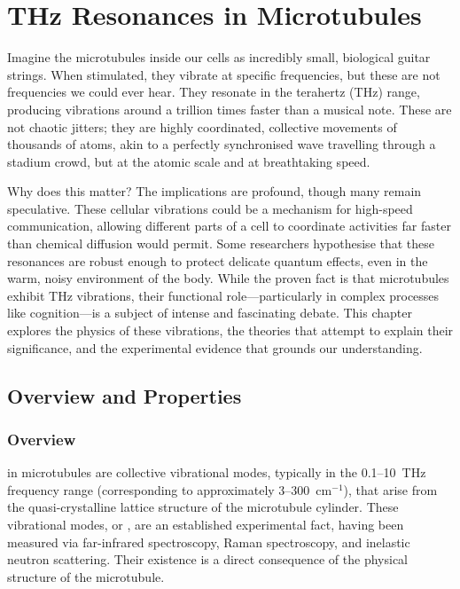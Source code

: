 
\chapter{THz Resonances in Microtubules}
\label{ch:thz-resonances-microtubules}

\begin{nontechnical}
    Imagine the microtubules inside our cells as incredibly small, biological guitar strings. When stimulated, they vibrate at specific frequencies, but these are not frequencies we could ever hear. They resonate in the terahertz (THz) range, producing vibrations around a trillion times faster than a musical note. These are not chaotic jitters; they are highly coordinated, collective movements of thousands of atoms, akin to a perfectly synchronised wave travelling through a stadium crowd, but at the atomic scale and at breathtaking speed.

    Why does this matter? The implications are profound, though many remain speculative. These cellular vibrations could be a mechanism for high-speed communication, allowing different parts of a cell to coordinate activities far faster than chemical diffusion would permit. Some researchers hypothesise that these resonances are robust enough to protect delicate quantum effects, even in the warm, noisy environment of the body. While the proven fact is that microtubules exhibit THz vibrations, their functional role---particularly in complex processes like cognition---is a subject of intense and fascinating debate. This chapter explores the physics of these vibrations, the theories that attempt to explain their significance, and the experimental evidence that grounds our understanding.
\end{nontechnical}

\section{Overview and Properties}

\subsection{Overview}

 in microtubules are collective vibrational modes, typically in the 0.1--10~THz frequency range (corresponding to approximately 3--300~cm\(^{-1}\)), that arise from the quasi-crystalline lattice structure of the microtubule cylinder. These vibrational modes, or , are an established experimental fact, having been measured via far-infrared spectroscopy, Raman spectroscopy, and inelastic neutron scattering. Their existence is a direct consequence of the physical structure of the microtubule.

